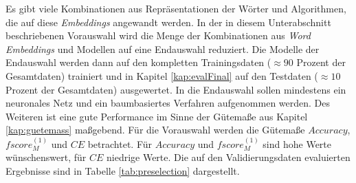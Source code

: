 \documentclass[a4paper,11pt]{article}
\begin{document}
Es gibt viele Kombinationen aus Repräsentationen der Wörter und Algorithmen, die auf diese \textit{Embeddings} angewandt werden. In der in diesem Unterabschnitt beschriebenen Vorauswahl wird die Menge der Kombinationen aus \textit{Word Embeddings} und Modellen auf eine Endauswahl reduziert. Die Modelle der Endauswahl werden dann auf den kompletten Trainingsdaten ($\approx 90$ Prozent der Gesamtdaten) trainiert und in Kapitel \ref{kap:evalFinal} auf den Testdaten ($\approx 10$ Prozent der Gesamtdaten) ausgewertet. In die Endauswahl sollen mindestens ein neuronales Netz und ein baumbasiertes Verfahren aufgenommen werden. Des Weiteren ist eine gute Performance im Sinne der Gütemaße aus Kapitel \ref{kap:guetemass} maßgebend. Für die Vorauswahl werden die Gütemaße $Accuracy$, $fscore_M^{(1)}$ und $CE$ betrachtet. Für $Accuracy$ und $fscore_M^{(1)}$ sind hohe Werte wünschenswert, für $CE$ niedrige Werte.
Die auf den Validierungsdaten evaluierten Ergebnisse sind in Tabelle \ref{tab:preselection} dargestellt.\\
\end{document}
